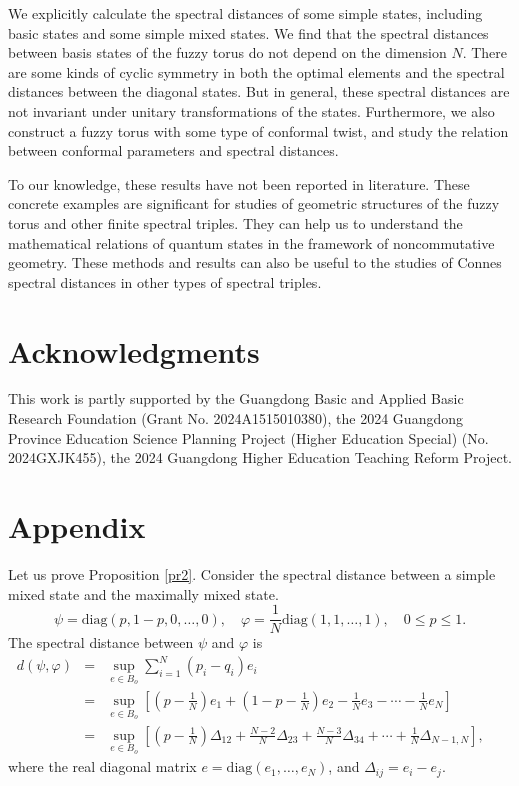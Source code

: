 \documentclass[a4paper,11pt]{article}
\begin{document}
We explicitly calculate the spectral distances of some simple states, including basic states and some simple mixed states. We find that the spectral distances between basis states of
the fuzzy torus do not depend on the dimension $N$. There are some kinds of cyclic symmetry in both the optimal elements and the spectral distances between the diagonal states. But in general, these spectral distances are not invariant under unitary transformations of the states.
Furthermore, we also construct a fuzzy torus with some type of conformal twist, and study the relation between conformal parameters and spectral distances.


To our knowledge, these results have not been reported in literature.
These concrete examples are significant for studies of geometric structures of the fuzzy torus and other finite spectral triples.
They can help us to understand the mathematical relations of quantum states in the framework of noncommutative geometry. These methods and results can also be useful to
the studies of Connes spectral distances in other types of spectral triples.






\section*{Acknowledgments}
This work is partly supported by the
Guangdong Basic and Applied Basic Research Foundation (Grant No.
2024A1515010380), the 2024 Guangdong Province Education Science Planning
Project (Higher Education Special) (No. 2024GXJK455), the 2024 Guangdong
Higher Education Teaching Reform Project.



\section*{Appendix}
Let us prove Proposition \ref{pr2}.
Consider the spectral distance between a simple mixed state and the maximally
mixed state.
\begin{equation}
  \psi = \mathrm{diag} (p, 1 - p, 0, \ldots, 0), \quad \varphi = \frac{1}{N}
  \mathrm{diag} (1, 1, \ldots, 1), \quad 0 \leqslant p \leqslant 1.
\end{equation}
The spectral distance between $\psi$ and $\varphi$ is
\begin{eqnarray}
  d (\psi, \varphi) & = & \sup_{e \in B_o} \sum_{i = 1}^N (p_i - q_i) e_i
  \nonumber\\
  & = & \sup_{e \in B_o} \left[ \left( p - \frac{1}{N} \right) e_1 + \left( 1
  - p - \frac{1}{N} \right) e_2 - \frac{1}{N} e_3 - \cdots - \frac{1}{N} e_N
  \right] \nonumber\\
  & = & \sup_{e \in B_o} \left[ \left( p - \frac{1}{N} \right) \Delta_{12} +
  \frac{N - 2}{N} \Delta_{23} + \frac{N - 3}{N} \Delta_{34} + \cdots +
  \frac{1}{N} \Delta_{N - 1, N} \right],~~~~~~
\end{eqnarray}
where the real diagonal matrix $e = \mathrm{diag} (e_1, \ldots, e_N)$, and
$\Delta_{ij} = e_i - e_j$.
\end{document}
